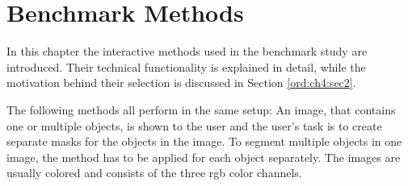 
\chapter{Benchmark Methods}\label{ord:ch3}

In this chapter the interactive methods used in the benchmark study are introduced.
Their technical functionality is explained in detail, while the motivation behind their selection is discussed in Section \ref{ord:ch4:sec2}.

The following methods all perform in the same setup: An image, that contains one or multiple objects, is shown to the user and the user's task is to create separate masks for the objects in the image.
To segment multiple objects in one image, the method has to be applied for each object separately.
The images are usually colored and consists of the three \gls{rgb} color channels.




